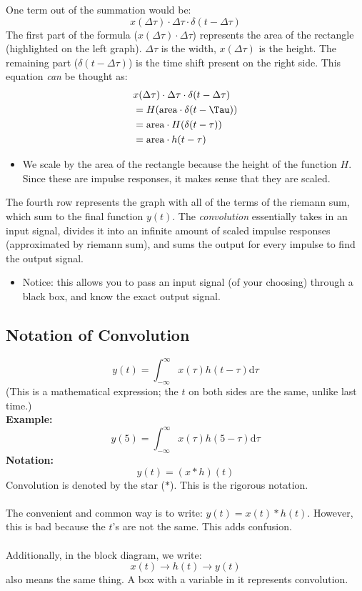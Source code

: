 \documentclass[10pt]{article}
\newcommand{\example}{\textbf{Example: }}
\begin{document}
One term out of the summation would be:
\[x(\Delta \tau) \cdot \Delta \tau \cdot \delta(t - \Delta \tau)\]
The first part of the formula ($x(\Delta \tau) \cdot \Delta \tau$) represents the area of the rectangle (highlighted on the left graph).  $\Delta \tau$ is the width, $x(\Delta \tau)$ is the height.  The remaining part ($\delta(t - \Delta \tau)$) is the time shift present on the right side.
This equation \textit{can} be thought as:
\begin{align*}
    & x(\Delta \tau) \cdot \Delta \tau \cdot \delta(t - \Delta \tau)\\
    &= H(\text{area} \cdot \delta(t - \Tau))\\
    &= \text{area} \cdot H(\delta(t - \tau))\\
    &= \text{area} \cdot h(t - \tau)
\end{align*}
\begin{itemize}
    \item We scale by the area of the rectangle because the height of the function $H$.  Since these are impulse responses, it makes sense that they are scaled.
\end{itemize}
The fourth row represents the graph with all of the terms of the riemann sum, which sum to the final function $y(t)$.
The \textit{convolution} essentially takes in an input signal, divides it into an infinite amount of scaled impulse responses (approximated by riemann sum), and sums the output for every impulse to find the output signal.
\begin{itemize}
    \item Notice: this allows you to pass an input signal (of your choosing) through a black box, and know the exact output signal.
\end{itemize}

\subsection*{Notation of Convolution}
\[y(t) = \int_{-\infty}^\infty x(\tau) h(t - \tau) \text{d}\tau\]
(This is a mathematical expression; the $t$ on both sides are the same, unlike last time.)\\
\example\\
\[y(5) = \int_{-\infty}^\infty x(\tau) h(5 - \tau) \text{d}\tau\]
\textbf{Notation:}
\[y(t) = (x * h)(t)\]
Convolution is denoted by the star ($*$).  This is the rigorous notation.\\\\
The convenient and common way is to write: $y(t) = x(t) * h(t)$.  However, this is bad because the $t$'s are not the same.  This adds confusion.\\\\
Additionally, in the block diagram, we write:
\[x(t) \longrightarrow \boxed{h(t)} \longrightarrow y(t)\]
also means the same thing.  A box with a variable in it represents convolution.
\end{document}
